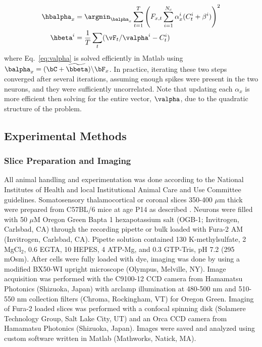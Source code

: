 \begin{align} \label{eq:valpha}
	\hbalpha_x &= \argmin_{\balpha_x} \sum_{t=1}^T  \left(F_{x,t}  \sum_{i=1}^{N_c} \alpha_x^i (C_t^i + \beta^i)\right)^2 \\
	\hbeta^i &= \frac{1}{T}\sum_t (\vF_t / \valpha^i - C_t^i) \label{eq:vbeta}
\end{align}
where Eq.~\eqref{eq:valpha} is solved efficiently in Matlab using $\balpha_x = (\bC + \widetilde{\bbeta})\backslash \bF_x$.  In practice, iterating these two steps converged after several iterations, assuming enough spikes were present in the two neurons, and they were sufficiently uncorrelated.  Note that updating each $\alpha_x$ is more efficient then solving for the entire vector, $\valpha$, due to the quadratic structure of the problem.








\subsection{Experimental Methods} \label{sec:exp}

\subsubsection{Slice Preparation and Imaging} 

All animal handling and experimentation was done according to the National Institutes of Health and local Institutional Animal Care and Use Committee guidelines. Somatosensory thalamocortical or coronal slices 350-400 $\mu$m thick were prepared from C57BL/6 mice at age P14 as described \cite{MacLeanYuste05}. Neurons were filled with 50 $\mu$M Oregon Green Bapta 1 hexapotassium salt (OGB-1; Invitrogen, Carlsbad, CA) through the recording pipette or bulk loaded with Fura-2 AM (Invitrogen, Carlsbad, CA). Pipette solution contained 130 K-methylsulfate, 2 MgCl$_2$, $0.6$ EGTA, 10 HEPES, 4 ATP-Mg, and $0.3$ GTP-Tris, pH 7.2 (295 mOsm).  After cells were fully loaded with dye, imaging was done by using a modified BX50-WI upright microscope (Olympus, Melville, NY).  Image acquisition was performed with the C9100-12 CCD camera from Hamamatsu Photonics (Shizuoka, Japan) with arclamp illumination at 480-500 nm and 510-550 nm collection filters (Chroma, Rockingham, VT) for Oregon Green.  Imaging of Fura-2 loaded slices was performed with a confocal spinning disk (Solamere Technology Group, Salt Lake City, UT) and an Orca CCD camera from Hamamatsu Photonics (Shizuoka, Japan). Images were saved and analyzed using custom software written in Matlab (Mathworks, Natick, MA).

